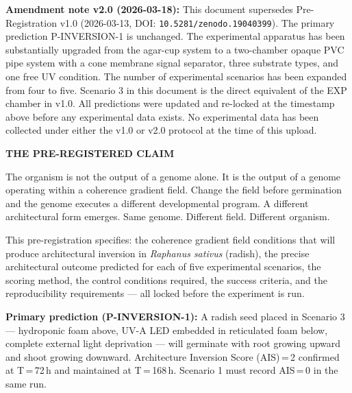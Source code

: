 \documentclass[10pt, a4paper]{article}
\begin{document}
\begin{mdframed}[
  backgroundcolor=warningbox,
  linecolor=rulecolor,
  linewidth=0.8pt,
  innertopmargin=0.5em,
  innerbottommargin=0.5em,
  innerleftmargin=0.8em,
  innerrightmargin=0.8em
]
\textbf{Amendment note v2.0 (2026-03-18):}
This document supersedes Pre-Registration v1.0
(2026-03-13, DOI: \texttt{10.5281/zenodo.19040399}).
The primary prediction P-INVERSION-1 is unchanged.
The experimental apparatus has been substantially upgraded
from the agar-cup system to a two-chamber opaque PVC pipe
system with a cone membrane signal separator, three
substrate types, and one free UV condition.
The number of experimental scenarios has been expanded
from four to five. Scenario 3 in this document is the
direct equivalent of the EXP chamber in v1.0.
All predictions were updated and re-locked at the
timestamp above before any experimental data exists.
No experimental data has been collected under either
the v1.0 or v2.0 protocol at the time of this upload.
\end{mdframed}

\vspace{0.5em}

\begin{mdframed}[
  backgroundcolor=claimbox,
  linecolor=claimbox,
  linewidth=0pt,
  innertopmargin=0.6em,
  innerbottommargin=0.6em,
  innerleftmargin=1.0em,
  innerrightmargin=1.0em
]
\color{white}
\textbf{THE PRE-REGISTERED CLAIM}

The organism is not the output of a genome alone.
It is the output of a genome operating within a coherence
gradient field.
Change the field before germination and the genome executes
a different developmental program.
A different architectural form emerges.
Same genome. Different field. Different organism.

\medskip
This pre-registration specifies: the coherence gradient field
conditions that will produce architectural inversion in
\textit{Raphanus sativus} (radish), the precise architectural
outcome predicted for each of five experimental scenarios,
the scoring method, the control conditions required, the
success criteria, and the reproducibility requirements ---
all locked before the experiment is run.

\medskip
\textbf{Primary prediction (P-INVERSION-1):}
A radish seed placed in Scenario 3 --- hydroponic foam
above, UV-A LED embedded in reticulated foam below, complete
external light deprivation --- will germinate with root
growing upward and shoot growing downward.
Architecture Inversion Score (AIS)\,=\,2 confirmed at
T\,=\,72\,h and maintained at T\,=\,168\,h.
Scenario 1 must record AIS\,=\,0 in the same run.
\end{mdframed}
\end{document}
